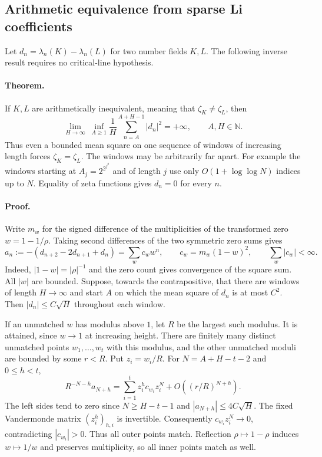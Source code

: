 \subsection{Arithmetic equivalence from sparse Li coefficients}

Let $d_n=\lambda_n(K)-\lambda_n(L)$ for two number fields $K,L$.
The following inverse result requires no critical-line hypothesis.

\paragraph{Theorem.}
If $K,L$ are arithmetically inequivalent, meaning that
$\zeta_K\ne\zeta_L$, then
\[
 \lim_{H\to\infty}\ \inf_{A\ge1}
   \frac1H\sum_{n=A}^{A+H-1}|d_n|^2=+\infty,
 \qquad A,H\in\mathbb N .
\]
Thus even a bounded mean square on one sequence of windows of increasing
length forces $\zeta_K=\zeta_L$. The windows may
be arbitrarily far apart. For example the windows starting at
$A_j=2^{2^{j^2}}$ and of length $j$ use only $O(1+\log\log N)$ indices
up to $N$. Equality of zeta functions gives $d_n=0$ for every $n$.

\paragraph{Proof.}
Write $m_w$ for the signed difference of the multiplicities of the
transformed zero $w=1-1/\rho$. Taking second differences of the two
symmetric zero sums gives
\[
 a_n:=-(d_{n+2}-2d_{n+1}+d_n)=\sum_w c_w w^n,\qquad
 c_w=m_w(1-w)^2,\qquad \sum_w|c_w|<\infty.
\]
Indeed, $|1-w|=|\rho|^{-1}$ and the zero count gives convergence
of the square sum. All $|w|$ are bounded. Suppose, towards the
contrapositive, that there are windows of length $H\to\infty$
and start $A$ on which the mean square of $d_n$ is at most $C^2$.
Then $|d_n|\le C\sqrt H$ throughout each window.

If an unmatched $w$ has modulus above $1$, let $R$ be the largest
such modulus. It is attained, since $w\to1$ at increasing height.
There are finitely many distinct unmatched points $w_1,\ldots,w_t$
with this modulus, and the other unmatched moduli are bounded by
some $r<R$. Put $z_i=w_i/R$. For $N=A+H-t-2$ and $0\le h<t$,
\[
 R^{-N-h}a_{N+h}
 =\sum_{i=1}^t z_i^h c_{w_i}z_i^N +O((r/R)^{N+h}).
\]
The left sides tend to zero since $N\ge H-t-1$ and
$|a_{N+h}|\le4C\sqrt H$. The fixed Vandermonde matrix
$(z_i^h)_{h,i}$ is invertible. Consequently $c_{w_i}z_i^N\to0$,
contradicting $|c_{w_i}|>0$. Thus all outer points match.
Reflection $\rho\mapsto1-\rho$ induces $w\mapsto1/w$ and preserves
multiplicity, so all inner points match as well.

